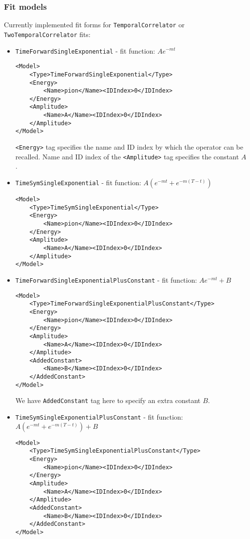 \documentclass[12pt]{article}
\newcommand{\vb}{\texttt}
\begin{document}
\subsubsection{Fit models} \label{sec:models}
Currently implemented fit forms for \vb{TemporalCorrelator} or \vb{TwoTemporalCorrelator} fits:
\begin{itemize}
\item \vb{TimeForwardSingleExponential} - fit function: $A e^{-mt}$
\begin{verbatim}
<Model>
    <Type>TimeForwardSingleExponential</Type>
    <Energy>
        <Name>pion</Name><IDIndex>0</IDIndex>
    </Energy>
    <Amplitude>
        <Name>A</Name><IDIndex>0</IDIndex>
    </Amplitude>
</Model>
\end{verbatim}
\vb{<Energy>} tag specifies the name and ID index by which the operator can be recalled.
Name and ID index of the \vb{<Amplitude>} tag specifies the constant $A$ .

\item \vb{TimeSymSingleExponential} - fit function:
  $A(e^{-mt} + e^{-m(T-t)})$
\begin{verbatim}
<Model>
    <Type>TimeSymSingleExponential</Type>
    <Energy>
        <Name>pion</Name><IDIndex>0</IDIndex>
    </Energy>
    <Amplitude>
        <Name>A</Name><IDIndex>0</IDIndex>
    </Amplitude>
</Model>
\end{verbatim}

\item \vb{TimeForwardSingleExponentialPlusConstant} - fit function:
  $A e^{-mt} + B$
\begin{verbatim}
<Model>
    <Type>TimeForwardSingleExponentialPlusConstant</Type>
    <Energy>
        <Name>pion</Name><IDIndex>0</IDIndex>
    </Energy>
    <Amplitude>
        <Name>A</Name><IDIndex>0</IDIndex>
    </Amplitude>
    <AddedConstant>
        <Name>B</Name><IDIndex>0</IDIndex>
    </AddedConstant>
</Model>
\end{verbatim}

We have \vb{AddedConstant} tag here to specify an extra constant $B$.

\item \vb{TimeSymSingleExponentialPlusConstant} - fit function:
  $A(e^{-mt} + e^{-m(T-t)} ) + B$
\begin{verbatim}
<Model>
    <Type>TimeSymSingleExponentialPlusConstant</Type>
    <Energy>
        <Name>pion</Name><IDIndex>0</IDIndex>
    </Energy>
    <Amplitude>
        <Name>A</Name><IDIndex>0</IDIndex>
    </Amplitude>
    <AddedConstant>
        <Name>B</Name><IDIndex>0</IDIndex>
    </AddedConstant>
</Model>
\end{verbatim}


\end{itemize}
\end{document}
